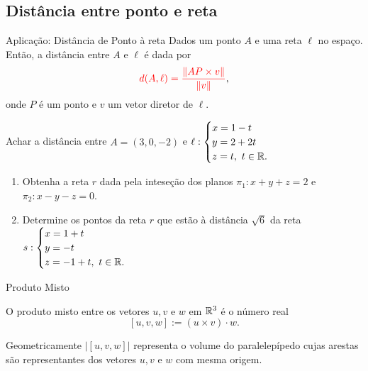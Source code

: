 \subsection*{Distância entre ponto e reta}

\begin{frame}[label=produtovetorial]{Aplicação: Distância de Ponto à reta}
Dados um ponto $A$ e uma reta $\ell$ no espaço. Então, a {\color{blue}distância entre $A$ e $\ell$ } é dada por 
\[{\color{red}d(A,\ell)=\frac{\|AP\times v\|}{\|v\|}},\]
onde $P$ é um ponto e $v$ um vetor diretor  de $\ell$.

\begin{exe}
	Achar a distância entre $A=(3,0,-2)$ e 
	$\ell:\begin{cases}
		x=1-t\\ y=2+2t\\ z=t,\ t\in \mathbb{R}.
	\end{cases}$
\end{exe}
	
\end{frame}


\begin{frame}[label=produtovetorial]{}
\begin{casa}
\begin{enumerate}
	\item Obtenha a reta $r$ dada pela inteseção dos planos $\pi_1: x+y+z=2$ e $\pi_2:x-y-z=0$.
	
	\item Determine os pontos da reta $r$ que estão à distância $\sqrt{6}$ da reta 
$s:\begin{cases}
	x=1+t\\ y=-t\\ z=-1+t,\ t\in \mathbb{R}.
\end{cases}$
\end{enumerate}
\end{casa}
	
\end{frame}

\begin{frame}[label=produtovetorial]{Produto Misto}
\begin{defin}
	O {\color{blue} produto misto} entre os vetores $u,v$ e $w$ em $\mathbb{R}^3$ é o número real
	\[[u,v,w]:=(u\times v)\cdot w.\]
	
Geometricamente $\left| [u,v,w]  \right|$ representa o volume do paralelepípedo cujas arestas são representantes dos vetores $u,v$ e $ w $ com mesma origem.
\end{defin}
	
\end{frame}





